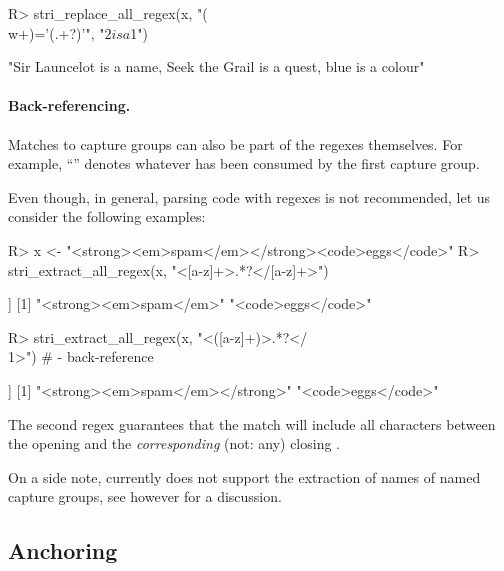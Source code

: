 \documentclass[nojss]{jss}\usepackage[]{graphicx}\usepackage[]{color}
\begin{document}
\begin{Schunk}
\begin{Sinput}
R> stri_replace_all_regex(x, "(\\w+)='(.+?)'", "$2 is a $1")
\end{Sinput}
\begin{Soutput}
[1] "Sir Launcelot is a name, Seek the Grail is a quest, blue is a colour"
\end{Soutput}
\end{Schunk}

\paragraph{Back-referencing.}
Matches to capture groups can also be part of the regexes themselves.
For example, ``'' denotes whatever
has been consumed by the first capture group.

Even though, in general, parsing  code with regexes is
not recommended, let us consider the following examples:

\begin{Schunk}
\begin{Sinput}
R> x <- "<strong><em>spam</em></strong><code>eggs</code>"
R> stri_extract_all_regex(x, "<[a-z]+>.*?</[a-z]+>")
\end{Sinput}
\begin{Soutput}
[[1]]
[1] "<strong><em>spam</em>" "<code>eggs</code>"
\end{Soutput}
\begin{Sinput}
R> stri_extract_all_regex(x, "<([a-z]+)>.*?</\\1>")  # \1 - back-reference
\end{Sinput}
\begin{Soutput}
[[1]]
[1] "<strong><em>spam</em></strong>" "<code>eggs</code>"
\end{Soutput}
\end{Schunk}

The second regex guarantees that the match will  include all characters
between the opening  and the \textit{corresponding} (not: any)
closing .




\bigskip
On a side note, currently  does not support the extraction
of names of named capture groups, see however \citep{namedCapture}
for a discussion.



\subsection{Anchoring}
\end{document}
